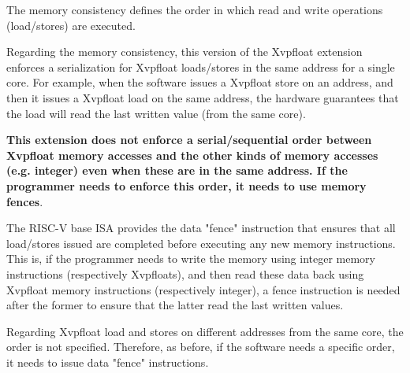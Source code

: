 The memory consistency defines the order in which read and write operations (load/stores) are executed.

Regarding the memory consistency, this version of the Xvpfloat extension enforces a serialization for Xvpfloat loads/stores in the same address for a single core. 
For example, when the software issues a Xvpfloat store on an address, and then it issues a Xvpfloat load on the same address, the hardware guarantees that the load will read the last written value (from the same core).

\textbf{This extension does not enforce a serial/sequential order between Xvpfloat memory accesses and the other kinds of memory accesses (e.g. integer) even when these are in the same address. 
If the programmer needs to enforce this order, it needs to use memory fences}.

The RISC-V base ISA provides the data "fence" instruction that ensures that all load/stores issued are completed before executing any new memory instructions. 
This is, if the programmer needs to write the memory using integer memory instructions (respectively Xvpfloats), and then read these data back using Xvpfloat memory instructions (respectively integer), a fence instruction is needed after the former to ensure that the latter read the last written values.

Regarding Xvpfloat load and stores on different addresses from the same core, the order is not specified. 
Therefore, as before, if the software needs a specific order, it needs to issue data "fence" instructions.
